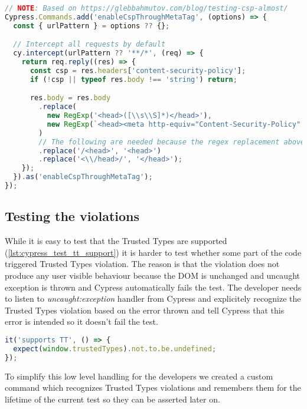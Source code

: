 \bigskip
\begin{lstlisting}[language=JavaScript, caption=Intercept requests and enable CSP header inside via meta tag]
// NOTE: Based on https://glebbahmutov.com/blog/testing-csp-almost/
Cypress.Commands.add('enableCspThroughMetaTag', (options) => {
  const { urlPattern } = options ?? {};

  // Intercept all requests by default
  cy.intercept(urlPattern ?? '**/*', (req) => {
    return req.reply((res) => {
      const csp = res.headers['content-security-policy'];
      if (!csp || typeof res.body !== 'string') return;

      res.body = res.body
        .replace(
          new RegExp('<head>([\\s\\S]*)</head>'),
          new RegExp(`<head><meta http-equiv="Content-Security-Policy" content="${csp}">$1</head>`).toString()
        )
        // The following are needed because the regex replacement above inserts some characters
        .replace('/<head>', '<head>')
        .replace('<\\/head>/', '</head>');
    });
  }).as('enableCspThroughMetaTag');
});
\end{lstlisting}

\subsection{Testing the violations}

While it is easy to test that the Trusted Types are supported (\ref{lst:cypress_test_tt_support}) it
is harder to test whether some part of the code triggered Trusted Types violation. The reason is
that the violation does not produce any user visible behaviour because the DOM is unchanged and
uncaught exception is thrown and Cypress automatically fails the test. The developer needs to listen
to \textit{uncaught:exception} handler from Cypress and explicitely recognize the Trusted Types
violation based on the error thrown and tell Cypress that this error is intended so it doesn't fail
the test.

\bigskip
\begin{lstlisting}[language=JavaScript, caption=Test Trusted Types support, label={lst:cypress_test_tt_support}]
it('supports TT', () => {
  expect(window.trustedTypes).not.to.be.undefined;
});
\end{lstlisting}

To simplify this low level handling for the developers we created a custom command which
recognizes Trusted Types violations and remembers them for the lifetime of the current test so they
can be asserted later on.

